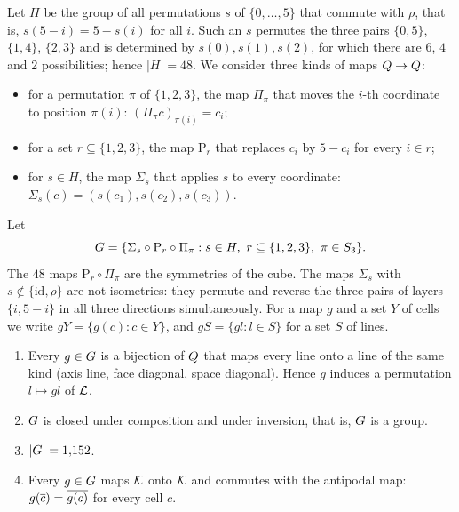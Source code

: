 Let $H$ be the group of all permutations $s$ of $\{0,\dots,5\}$ that commute with $\rho$, that is,
$s(5-i)=5-s(i)$ for all $i$. Such an $s$ permutes the three pairs $\{0,5\}$, $\{1,4\}$, $\{2,3\}$ and is
determined by $s(0),s(1),s(2)$, for which there are $6$, $4$ and $2$ possibilities; hence $|H|=48$. We
consider three kinds of maps $Q\to Q$:
\begin{itemize}
\item for a permutation $\pi$ of $\{1,2,3\}$, the map $\Pi_\pi$ that moves the $i$-th coordinate to
      position $\pi(i)$: $(\Pi_\pi c)_{\pi(i)}=c_i$;
\item for a set $r\subseteq\{1,2,3\}$, the map $\mathrm{P}_r$ that replaces $c_i$ by $5-c_i$ for every
      $i\in r$;
\item for $s\in H$, the map $\Sigma_s$ that applies $s$ to every coordinate:
      $\Sigma_s(c)=(s(c_1),s(c_2),s(c_3))$.
\end{itemize}
Let
\[
  G=\{\Sigma_s\circ\mathrm{P}_r\circ\Pi_\pi : s\in H,\ r\subseteq\{1,2,3\},\ \pi\in S_3\}.
\]
The $48$ maps $\mathrm{P}_r\circ\Pi_\pi$ are the symmetries of the cube. The maps $\Sigma_s$ with
$s\notin\{\mathrm{id},\rho\}$ are not isometries: they permute and reverse the three pairs of layers
$\{i,5-i\}$ in all three directions simultaneously. For a map $g$ and a set $Y$ of cells we write
$gY=\{g(c):c\in Y\}$, and $gS=\{gl : l\in S\}$ for a set $S$ of lines.

\begin{lemma}\label{lem:group}
\begin{enumerate}[label=\textup{(\alph*)}]
\item Every $g\in G$ is a bijection of $Q$ that maps every line onto a line of the same kind (axis line,
      face diagonal, space diagonal). Hence $g$ induces a permutation $l\mapsto gl$ of $\mathcal{L}$.
\item $G$ is closed under composition and under inversion, that is, $G$ is a group.
\item $|G|=1{,}152$.
\item Every $g\in G$ maps $\mathcal{K}$ onto $\mathcal{K}$ and commutes with the antipodal map:
      $g(\overline{c})=\overline{g(c)}$ for every cell $c$.
\end{enumerate}
\end{lemma}

